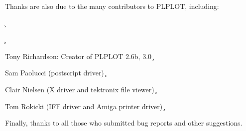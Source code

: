 Thanks are also due to the many contributors to PLPLOT, including:

\c \begin{description}
\c \item Tony Richardson: Creator of PLPLOT 2.6b, 3.0
\c \item Sam Paolucci (postscript driver)
\c \item Clair Nielsen (X driver and tektronix file viewer)
\c \item Tom Rokicki (IFF driver and Amiga printer driver)
\c \end{description}

Finally, thanks to all those who submitted bug reports and other
suggestions.
